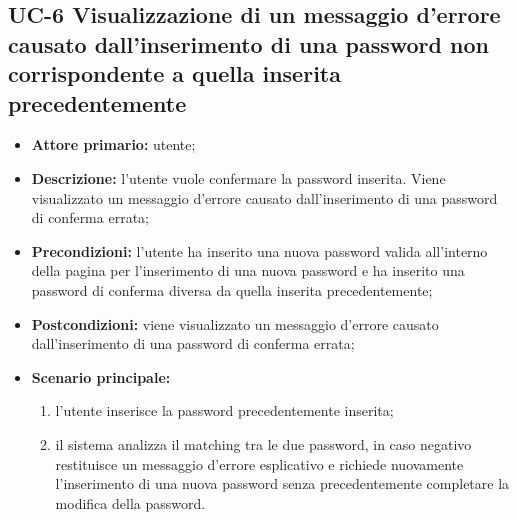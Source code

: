 \subsection{UC-6 Visualizzazione di un messaggio d'errore causato dall'inserimento di una password non corrispondente a quella inserita precedentemente}
\begin{itemize}
	\item \textbf{Attore primario:} utente;

	\item\textbf{Descrizione:} l'utente vuole confermare la password inserita. Viene visualizzato un messaggio d'errore causato dall'inserimento di una password di conferma errata;

	\item\textbf{Precondizioni:} l'utente ha inserito una nuova password valida all'interno della pagina per l'inserimento di una nuova password e ha inserito una password di conferma diversa da quella inserita precedentemente;

	\item\textbf{Postcondizioni:} viene visualizzato un messaggio d'errore causato dall'inserimento di una password di conferma errata;

	\item \textbf{Scenario principale:}
	      \begin{enumerate}
		      \item l'utente inserisce la password precedentemente inserita;
		      \item il sistema analizza il matching tra le due password, in caso negativo restituisce un messaggio d'errore esplicativo e richiede nuovamente l'inserimento di una nuova password senza precedentemente completare la modifica della password.
	      \end{enumerate}
\end{itemize}
